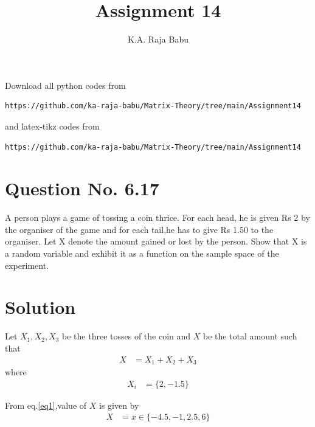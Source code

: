 \documentclass[journal,12pt,twocolumn]{IEEEtran}
\begin{document}
\makeatletter
{}
\makeatother
\let\StandardTheFigure\thefigure
\let\vec\mathbf
\renewcommand{\thefigure}{\theproblem}
\def\putbox#1#2#3{\makebox[0in][l]{\makebox[#1][l]{}\raisebox{\baselineskip}[0in][0in]{\raisebox{#2}[0in][0in]{#3}}}}
     \def\rightbox#1{\makebox[0in][r]{#1}}
     \def\centbox#1{\makebox[0in]{#1}}
     \def\topbox#1{\raisebox{-\baselineskip}[0in][0in]{#1}}
     \def\midbox#1{\raisebox{-0.5\baselineskip}[0in][0in]{#1}}
\vspace{3cm}
\title{Assignment 14}
\author{K.A. Raja Babu}
\maketitle
\newpage
\bigskip
\renewcommand{\thefigure}{\theenumi}
\renewcommand{\thetable}{\theenumi}
Download all python codes from 
\begin{lstlisting}
https://github.com/ka-raja-babu/Matrix-Theory/tree/main/Assignment14
\end{lstlisting}
%
and latex-tikz codes from 
%
\begin{lstlisting}
https://github.com/ka-raja-babu/Matrix-Theory/tree/main/Assignment14
\end{lstlisting}
%
\section{Question No. 6.17}

A person plays a game of tossing a coin thrice. For each head, he is given Rs 2 by the organiser of the game and for each tail,he has to give Rs 1.50 to the organiser. Let X denote the amount gained or lost by the person. Show that X is a random variable and exhibit it as a function on the sample space of the experiment.

\section{Solution}

Let $X_1,X_2,X_3$ be the three tosses of the coin and $X$ be the total amount such that
\begin{align}
    X &= X_1+X_2+X_3 \label{eq1}
\end{align}
where
\begin{align}
    X_i &= \{2,-1.5\}
\end{align}

From eq.\eqref{eq1},value of $X$ is given by
\begin{align}
    X &= x \in \{-4.5,-1,2.5,6\}
\end{align}
\end{document}
